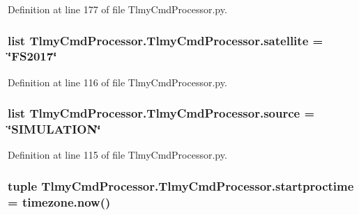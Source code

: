 Definition at line 177 of file Tlmy\+Cmd\+Processor.\+py.

\hypertarget{namespace_tlmy_cmd_processor_1_1_tlmy_cmd_processor_a5cf95a9cff868554c46d7a901df74673}{}
\subsubsection[{satellite}]{\setlength{\rightskip}{0pt plus 5cm}list Tlmy\+Cmd\+Processor.\+Tlmy\+Cmd\+Processor.\+satellite = \char`\"{}F\+S2017\char`\"{}}\label{namespace_tlmy_cmd_processor_1_1_tlmy_cmd_processor_a5cf95a9cff868554c46d7a901df74673}


Definition at line 116 of file Tlmy\+Cmd\+Processor.\+py.

\hypertarget{namespace_tlmy_cmd_processor_1_1_tlmy_cmd_processor_acef2a3d30bda6af9c56309eea6b12246}{}
\subsubsection[{source}]{\setlength{\rightskip}{0pt plus 5cm}list Tlmy\+Cmd\+Processor.\+Tlmy\+Cmd\+Processor.\+source = \char`\"{}S\+I\+M\+U\+L\+A\+T\+I\+O\+N\char`\"{}}\label{namespace_tlmy_cmd_processor_1_1_tlmy_cmd_processor_acef2a3d30bda6af9c56309eea6b12246}


Definition at line 115 of file Tlmy\+Cmd\+Processor.\+py.

\hypertarget{namespace_tlmy_cmd_processor_1_1_tlmy_cmd_processor_a58134e0397913f644139bdd4478e338f}{}
\subsubsection[{startproctime}]{\setlength{\rightskip}{0pt plus 5cm}tuple Tlmy\+Cmd\+Processor.\+Tlmy\+Cmd\+Processor.\+startproctime = timezone.\+now()}\label{namespace_tlmy_cmd_processor_1_1_tlmy_cmd_processor_a58134e0397913f644139bdd4478e338f}



